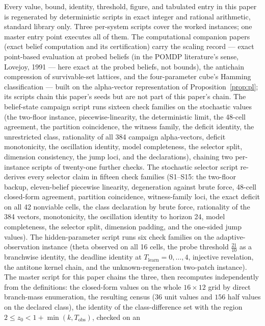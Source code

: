 \documentclass[10pt,twocolumn]{article}
\theoremstyle{plain}
\theoremstyle{definition}
\theoremstyle{remark}
\begin{document}
Every value, bound, identity, threshold, figure, and tabulated entry in
this paper is regenerated by deterministic scripts in exact integer and
rational arithmetic, standard library only. Three per-system scripts cover the worked instances; one master entry point executes all of them.
The computational companion papers (exact belief computation and its certification) carry the scaling record --- exact
point-based evaluation at probed beliefs (in the POMDP literature's
sense, Lovejoy, 1991 --- here exact at the probed beliefs, not bounds),
the antichain compression of
survivable-set lattices, and the four-parameter cube's Hamming
classification --- built on the alpha-vector representation of
Proposition~\ref{prop:pl}; its scripts chain this paper's seeds but
are not part of this paper's chain.
The belief-state campaign script runs sixteen check families on the
stochastic values (the two-floor instance, piecewise-linearity, the
deterministic limit, the 48-cell agreement, the partition coincidence,
the witness family, the deficit identity, the unrestricted class,
rationality of all 384 campaign alpha-vectors, deficit monotonicity, the
oscillation identity, model completeness, the selector split, dimension
consistency, the jump loci, and the declarations), chaining two
per-instance scripts of twenty-one further checks. The stochastic
selector script re-derives every selector claim in fifteen check
families (S1--S15: the two-floor backup, eleven-belief piecewise
linearity, degeneration against brute force, 48-cell closed-form
agreement, partition coincidence, witness-family loci, the exact
deficit on all 42 nonviable cells, the class declaration by brute
force, rationality of the 384 vectors, monotonicity, the oscillation
identity to horizon 24, model completeness, the selector split,
dimension padding, and the one-sided jump values). The hidden-parameter
script runs six check families on the adaptive-observation instance
(theta observed on all 16 cells, the probe threshold
\(\tfrac{21}{10}\) as a branchwise identity, the deadline identity at
\(T_{\mathrm{learn}} = 0, \dots, 4\), injective revelation, the
antitone kernel chain, and the unknown-regeneration two-patch
instance). The master script for this paper chains the three, then
recomputes independently from the definitions: the closed-form values on
the whole \(16 \times 12\) grid by direct branch-mass enumeration, the
resulting census (\(36\) unit values and \(156\) half values on the
declared class), the identity of the class-difference set with the region
\(2 \le z_{0} < 1 + \min(k, T_{\mathrm{obs}})\), checked on an
\end{document}
